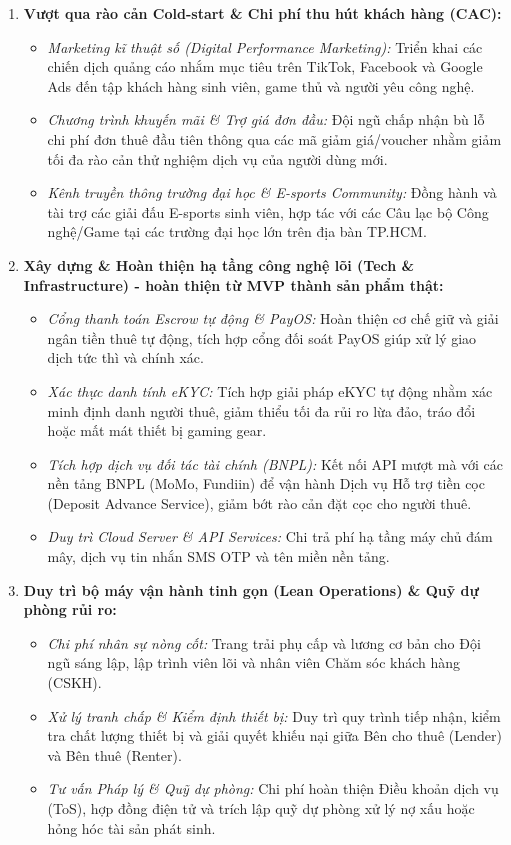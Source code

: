 \begin{enumerate}
    \item \textbf{Vượt qua rào cản Cold-start \& Chi phí thu hút khách hàng (CAC):}
    \begin{itemize}
        \item \textit{Marketing kĩ thuật số (Digital Performance Marketing):} Triển khai các chiến dịch quảng cáo nhắm mục tiêu trên TikTok, Facebook và Google Ads đến tập khách hàng sinh viên, game thủ và người yêu công nghệ.
        \item \textit{Chương trình khuyến mãi \& Trợ giá đơn đầu:} Đội ngũ chấp nhận bù lỗ chi phí đơn thuê đầu tiên thông qua các mã giảm giá/voucher nhằm giảm tối đa rào cản thử nghiệm dịch vụ của người dùng mới.
        \item \textit{Kênh truyền thông trường đại học \& E-sports Community:} Đồng hành và tài trợ các giải đấu E-sports sinh viên, hợp tác với các Câu lạc bộ Công nghệ/Game tại các trường đại học lớn trên địa bàn TP.HCM.
    \end{itemize}

    \item \textbf{Xây dựng \& Hoàn thiện hạ tầng công nghệ lõi (Tech \& Infrastructure) - hoàn thiện từ MVP thành sản phẩm thật:}
    \begin{itemize}
        \item \textit{Cổng thanh toán Escrow tự động \& PayOS:} Hoàn thiện cơ chế giữ và giải ngân tiền thuê tự động, tích hợp cổng đối soát PayOS giúp xử lý giao dịch tức thì và chính xác.
        \item \textit{Xác thực danh tính eKYC:} Tích hợp giải pháp eKYC tự động nhằm xác minh định danh người thuê, giảm thiểu tối đa rủi ro lừa đảo, tráo đổi hoặc mất mát thiết bị gaming gear.
        \item \textit{Tích hợp dịch vụ đối tác tài chính (BNPL):} Kết nối API mượt mà với các nền tảng BNPL (MoMo, Fundiin) để vận hành Dịch vụ Hỗ trợ tiền cọc (Deposit Advance Service), giảm bớt rào cản đặt cọc cho người thuê.
        \item \textit{Duy trì Cloud Server \& API Services:} Chi trả phí hạ tầng máy chủ đám mây, dịch vụ tin nhắn SMS OTP và tên miền nền tảng.
    \end{itemize}

    \item \textbf{Duy trì bộ máy vận hành tinh gọn (Lean Operations) \& Quỹ dự phòng rủi ro:}
    \begin{itemize}
        \item \textit{Chi phí nhân sự nòng cốt:} Trang trải phụ cấp và lương cơ bản cho Đội ngũ sáng lập, lập trình viên lõi và nhân viên Chăm sóc khách hàng (CSKH).
        \item \textit{Xử lý tranh chấp \& Kiểm định thiết bị:} Duy trì quy trình tiếp nhận, kiểm tra chất lượng thiết bị và giải quyết khiếu nại giữa Bên cho thuê (Lender) và Bên thuê (Renter).
        \item \textit{Tư vấn Pháp lý \& Quỹ dự phòng:} Chi phí hoàn thiện Điều khoản dịch vụ (ToS), hợp đồng điện tử và trích lập quỹ dự phòng xử lý nợ xấu hoặc hỏng hóc tài sản phát sinh.
    \end{itemize}
\end{enumerate}


